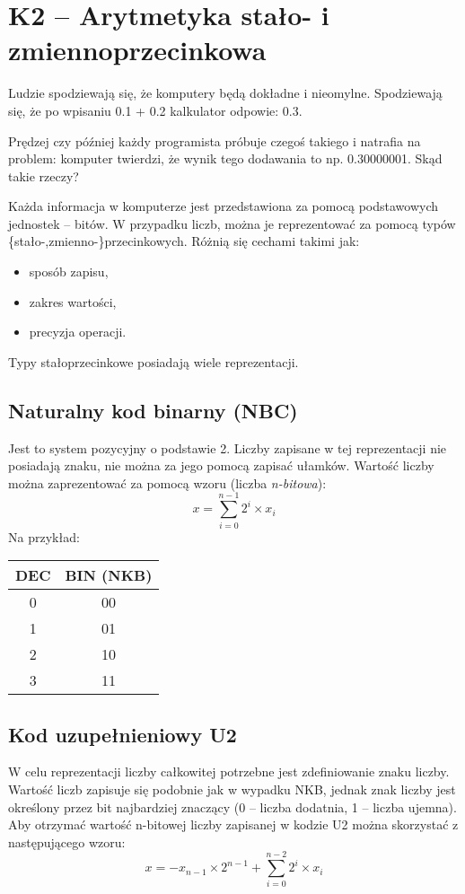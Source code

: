 \section{K2 -- Arytmetyka stało- i zmiennoprzecinkowa}

Ludzie spodziewają się, że komputery będą dokładne i nieomylne.
Spodziewają się, że po wpisaniu 0.1 + 0.2 kalkulator odpowie: 0.3.

Prędzej czy później każdy programista próbuje czegoś takiego i natrafia na problem: komputer twierdzi, że wynik tego dodawania to np. 0.30000001.
Skąd takie rzeczy?


Każda informacja w komputerze jest przedstawiona za pomocą podstawowych jednostek -- bitów. W przypadku liczb, można je reprezentować za pomocą typów \{stało-,zmienno-\}przecinkowych. Różnią się cechami takimi jak:
\begin{itemize}
	\setlength\itemsep{1pt}
	\item sposób zapisu,
	\item zakres wartości,
	\item precyzja operacji.
\end{itemize}

Typy stałoprzecinkowe posiadają wiele reprezentacji. 

\subsection{Naturalny kod binarny (NBC)}
Jest to system pozycyjny o podstawie 2. Liczby zapisane w tej reprezentacji nie posiadają znaku, nie można za jego pomocą zapisać ułamków. Wartość liczby można zaprezentować za pomocą wzoru (liczba \textit{n-bitowa}):
\begin{equation}
x = \sum_{i=0}^{n-1}2^{i} \times x_{i}
\end{equation}
Na przykład:
\begin{table}[H]
	\centering
	\begin{tabular}{|c|c|} \hline
		DEC	&	BIN (NKB)	\\ \hline
		0	&	00	\\ \hline
		1	&	01	\\ \hline
		2	&	10	\\ \hline
		3	&	11	\\ \hline
	\end{tabular}
\end{table}

\subsection{Kod uzupełnieniowy U2}
W celu reprezentacji liczby całkowitej potrzebne jest zdefiniowanie znaku liczby. Wartość liczb zapisuje się podobnie jak w wypadku NKB, jednak znak liczby jest określony przez bit najbardziej znaczący (0 -- liczba dodatnia, 1 -- liczba ujemna).
Aby otrzymać wartość n-bitowej liczby zapisanej w kodzie U2 można skorzystać z następującego wzoru:
\begin{equation}
x = -x_{n-1}\times 2^{n-1}+\sum_{i=0}^{n-2}2^{i} \times x_{i}
\end{equation}

